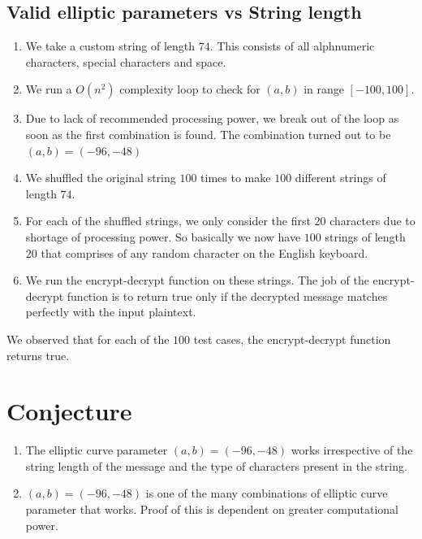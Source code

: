 \documentclass[a4paper,12pt]{article}
\begin{document}
\subsection{Valid elliptic parameters vs String length}
\begin{enumerate}
	\item We take a custom string of length $74$. This consists of all alphnumeric characters, special characters and space.
	\item We run a $O(n^2)$ complexity loop to check for $(a,b)$ in range $[-100,100]$.
	\item Due to lack of recommended processing power, we break out of the loop as soon as the first combination is found. The combination turned out to be $(a,b)=(-96,-48)$
	\item We shuffled the original string $100$ times to make $100$ different strings of length $74$.
	\item For each of the shuffled strings, we only consider the first 20 characters due to shortage of processing power. So basically we now have $100$ strings of length $20$ that comprises of any random character on the English keyboard.
	\item We run the encrypt-decrypt function on these strings. The job of the encrypt-decrypt function is to return true only if the decrypted message matches perfectly with the input plaintext.
\end{enumerate}

\begin{flushleft}
We observed that for each of the $100$ test cases, the encrypt-decrypt function returns true.
\end{flushleft}

\section{Conjecture}
\begin{enumerate}
	\item The elliptic curve parameter $(a,b)=(-96,-48)$ works irrespective of the string length of the message and the type of characters present in the string.
	\item $(a,b)=(-96,-48)$ is one of the many combinations of elliptic curve parameter that works. Proof of this is dependent on greater computational power.
\end{enumerate}
\end{document}
